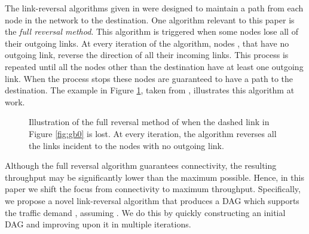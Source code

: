 \documentclass{sig-alternate-2013}
\begin{document}
The link-reversal algorithms given in \cite{gafni_bertsekas} were designed to maintain a path from each node in the network to the destination. One algorithm relevant to this paper is  the \emph{full reversal method}. This algorithm is triggered when some nodes  lose all of their outgoing links. At every iteration of the algorithm, nodes , that have no outgoing link, reverse the direction of all their incoming links. This process is repeated until all the nodes other than the destination have at least one outgoing link. When the process stops these nodes are guaranteed to have a path to the destination.
The example in Figure \ref{fig:gb_example}, taken from \cite{gafni_bertsekas}, illustrates this algorithm at work. 
\begin{figure}[h!]
\centering
{}
\caption{Illustration of the full reversal method of \cite{gafni_bertsekas} when the dashed link in Figure \ref{fig:gb0}  is lost. At every iteration, the algorithm reverses all the links incident to the nodes with no outgoing link.}
\label{fig:gb_example}
\end{figure}


Although the full reversal algorithm guarantees connectivity, the resulting throughput may be significantly lower than the maximum possible. Hence, in this paper we shift the focus from connectivity to maximum throughput. Specifically, we propose a novel link-reversal algorithm that produces a DAG which supports the traffic demand , assuming . We do this by quickly constructing an initial DAG and improving upon it in multiple iterations.
\end{document}
